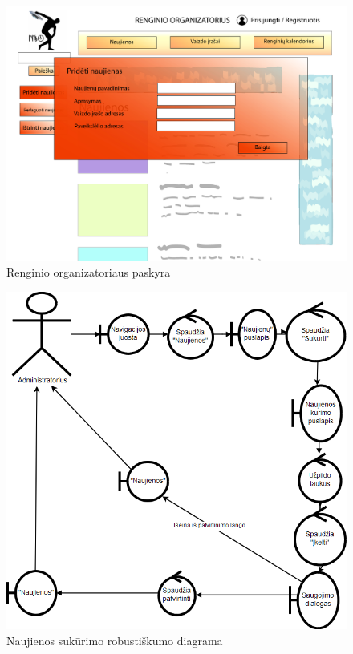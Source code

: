 \documentclass{VUMIFPSkursinis}
\begin{document}
\begin{enumerate} [label = \textbf{U\arabic*.}]
					\begin{figure}[H]
						\centering
						\includegraphics[width=\textwidth]{img/PSI4/OrganizatoriusNaujienos-01.jpg}
						\caption{Renginio organizatoriaus paskyra}
						\label{fig:uzd_org_pridetiNaujienas}
					\end{figure}
				
					\begin{figure}[H]
						\centering
						\includegraphics[width=\textwidth]{img/PSI5/u20.png}
						\caption{Naujienos sukūrimo robustiškumo diagrama}
						\label{draw:u20}
					\end{figure}
			

\end{enumerate}
\end{document}
